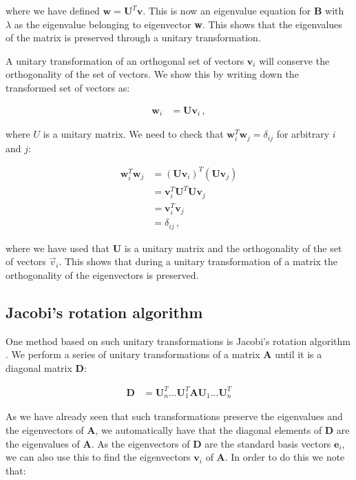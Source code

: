 \documentclass[reprint,english,notitlepage]{revtex4-1}  %
\begin{document}
where we have defined $\textbf{w} = \textbf{U}^T \textbf{v}$. This is now an eigenvalue equation for \textbf{B} with $\lambda$ as the eigenvalue belonging to eigenvector \textbf{w}. This shows that the eigenvalues of the matrix is preserved through a unitary transformation.

A unitary transformation of an orthogonal set of vectors $\textbf{v}_i$ will conserve the orthogonality of the set of vectors. We show this by writing down the transformed set of vectors as:

\begin{align*}
\textbf{w}_i &= \textbf{U} \textbf{v}_i \, ,
\end{align*}

where $U$ is a unitary matrix. We need to check that $\textbf{w}_i^T \textbf{w}_j = \delta_{ij}$ for arbitrary $i$ and $j$:

\begin{align*}
\textbf{w}_i^T \textbf{w}_j &= (\textbf{U}\textbf{v}_i)^T (\textbf{U}\textbf{v}_j) \\
&= \textbf{v}_i^T \textbf{U}^T \textbf{U} \textbf{v}_j \\
&= \textbf{v}_i^T \textbf{v}_j \\
&= \delta_{ij} \, ,
\end{align*}

where we have used that $\textbf{U}$ is a unitary matrix and the orthogonality of the set of vectors $\vec{v}_i$. This shows that during a unitary transformation of a matrix the orthogonality of the eigenvectors is preserved.


\subsection{Jacobi's rotation algorithm} \label{sec:II:b}

One method based on such unitary transformations is Jacobi's rotation algorithm \citep{Jacobi1846}. We perform a series of unitary transformations of a matrix \textbf{A} until it is a diagonal matrix \textbf{D}:

\begin{align*}
\textbf{D} &= \textbf{U}_n^T ... \textbf{U}_1^T \textbf{AU}_1 ... \textbf{U}_n^T
\end{align*}

As we have already seen that such transformations preserve the eigenvalues and the eigenvectors of \textbf{A}, we automatically have that the diagonal elements of \textbf{D} are the eigenvalues of \textbf{A}. As the eigenvectors of \textbf{D} are the standard basis vectors $\textbf{e}_i$, we can also use this to find the eigenvectors $\textbf{v}_i$ of \textbf{A}. In order to do this we note that:
\end{document}

